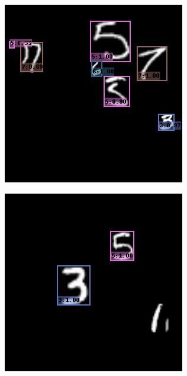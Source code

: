 \begin{figure}[h!]
\begin{subfigure}[b]{0.193\textwidth}
    \end{subfigure}
    \hfill
    \begin{subfigure}[b]{0.193\textwidth}
        \centering
        \includegraphics[width=\textwidth]{Images/mnist_output/2.png}
    \end{subfigure}
    \hfill
    \begin{subfigure}[b]{0.193\textwidth}
        \centering
        \includegraphics[width=\textwidth]{Images/mnist_output/3.png}

\end{subfigure}
\end{figure}
